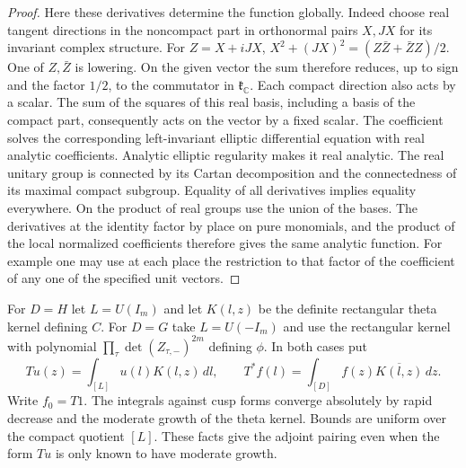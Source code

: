 \documentclass[a4paper,11pt]{article}
\theoremstyle{definition}
\theoremstyle{remark}
\numberwithin{equation}{section}
\begin{document}
\begin{proof}
Here these derivatives determine the function globally.
Indeed choose real tangent directions in the noncompact
part in orthonormal pairs \(X,JX\) for its invariant complex
structure. For \(Z=X+iJX\),
\(X^2+(JX)^2=(Z\bar Z+\bar Z Z)/2\).
One of \(Z,\bar Z\) is lowering. On the given vector the sum
therefore reduces, up to sign and the factor \(1/2\), to the
commutator in \(\mathfrak k_{\mathbb C}\). Each compact
direction also acts by a scalar. The sum of the squares
of this real basis, including a basis of the compact part,
consequently acts on the vector by a fixed scalar. The
coefficient solves the corresponding left-invariant elliptic
differential equation with real analytic coefficients.
Analytic elliptic regularity makes it real analytic.
The real unitary group is connected by its Cartan
decomposition and the connectedness of its maximal compact
subgroup. Equality of all derivatives implies equality everywhere.
On the product of real groups use the union of the bases.
The derivatives at the identity factor by place on pure
monomials, and the product of the local normalized coefficients
therefore gives the same analytic function. For example one
may use at each place the restriction to that factor of the
coefficient of any one of the specified unit vectors.
\end{proof}

For \(D=H\) let \(L=U(I_m)\) and let \(K(l,z)\) be the
definite rectangular theta kernel defining \(C\).
For \(D=G\) take \(L=U(-I_m)\) and use the rectangular
kernel with polynomial \(\prod_\tau\det(Z_{\tau,-})^{2m}\)
defining \(\phi\). In both cases put
\[
 T u(z)=\int_{[L]}u(l)K(l,z)\,dl,\qquad
 T^* f(l)=\int_{[D]}f(z)\overline{K(l,z)}\,dz .
\]
Write \(f_0=T1\). The integrals against cusp forms converge
absolutely by rapid decrease and the moderate growth of the
theta kernel. Bounds are uniform over the compact quotient
\([L]\). These facts give the adjoint pairing even when the
form \(Tu\) is only known to have moderate growth.
\end{document}
